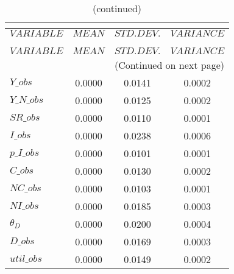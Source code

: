  
\begin{center}
\begin{longtable}{lccc} 
\caption{THEORETICAL MOMENTS}\\
 \label{Table:th_moments}\\
\toprule 
$VARIABLE    $	 & 	 $         MEAN$	 & 	 $    STD. DEV.$	 & 	 $     VARIANCE$\\
\midrule \endfirsthead 
\caption{(continued)}\\
 \toprule \\ 
$VARIABLE    $	 & 	 $         MEAN$	 & 	 $    STD. DEV.$	 & 	 $     VARIANCE$\\
\midrule \endhead 
\midrule \multicolumn{4}{r}{(Continued on next page)} \\ \bottomrule \endfoot 
\bottomrule \endlastfoot 
$Y\_obs      $	 & 	       0.0000	 & 	       0.0141	 & 	       0.0002 \\ 
$Y\_N\_obs   $	 & 	       0.0000	 & 	       0.0125	 & 	       0.0002 \\ 
$SR\_obs     $	 & 	       0.0000	 & 	       0.0110	 & 	       0.0001 \\ 
$I\_obs      $	 & 	       0.0000	 & 	       0.0238	 & 	       0.0006 \\ 
$p\_I\_obs   $	 & 	       0.0000	 & 	       0.0101	 & 	       0.0001 \\ 
$C\_obs      $	 & 	       0.0000	 & 	       0.0130	 & 	       0.0002 \\ 
$NC\_obs     $	 & 	       0.0000	 & 	       0.0103	 & 	       0.0001 \\ 
$NI\_obs     $	 & 	       0.0000	 & 	       0.0185	 & 	       0.0003 \\ 
${\theta_D}  $	 & 	       0.0000	 & 	       0.0200	 & 	       0.0004 \\ 
$D\_obs      $	 & 	       0.0000	 & 	       0.0169	 & 	       0.0003 \\ 
$util\_obs   $	 & 	       0.0000	 & 	       0.0149	 & 	       0.0002 \\ 
\end{longtable}
 \end{center}
